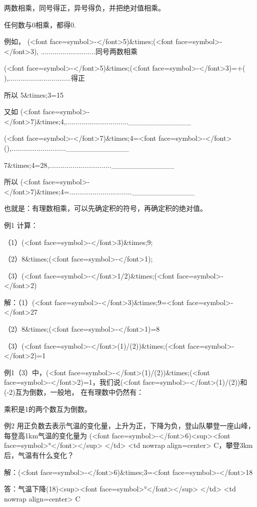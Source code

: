 两数相乘，同号得正，异号得负，并把绝对值相乘。

任何数与0相乘，都得0.

例如，  (<font face=symbol>-</font>5)&times;(<font face=symbol>-</font>3), ............................同号两数相乘

        (<font face=symbol>-</font>5)&times;(<font face=symbol>-</font>3)=+( ),................................得正

所以    5&times;3=15

又如    (<font face=symbol>-</font>7)&times;4,................................____________

        (<font face=symbol>-</font>7)&times;4=<font face=symbol>-</font>(),............................____________

        7&times;4=28,................................____________

所以    (<font face=symbol>-</font>7)&times;4=................................____________

也就是：有理数相乘，可以先确定积的符号，再确定积的绝对值。

\beginexample

例1 计算：

（1）(<font face=symbol>-</font>3)&times;9;

（2）8&times;(<font face=symbol>-</font>1);

（3）(<font face=symbol>-</font>1/2)&times;(<font face=symbol>-</font>2)

解：（1）(<font face=symbol>-</font>3)&times;9=<font face=symbol>-</font>27

（2）8&times;(<font face=symbol>-</font>1)=8

（3）(<font face=symbol>-</font>(1)/(2))&times;(<font face=symbol>-</font>2)=1

例1（3）中，(<font face=symbol>-</font>(1)/(2))&times;(<font face=symbol>-</font>2)=1，我们说(<font face=symbol>-</font>(1)/(2))和(-2)互为倒数，一般地，
在有理数中仍然有：

乘积是1的两个数互为倒数。

例2 用正负数去表示气温的变化量，上升为正，下降为负，登山队攀登一座山峰，每登高1km气温的变化量为
(<font face=symbol>-</font>6)<sup><font face=symbol>°</font></sup>
</td>
<td nowrap align=center>
  C，攀登3km后，气温有什么变化？

解：(<font face=symbol>-</font>6)&times;3=<font face=symbol>-</font>18

答：气温下降(18)<sup><font face=symbol>°</font></sup>
</td>
<td nowrap align=center>
  C

